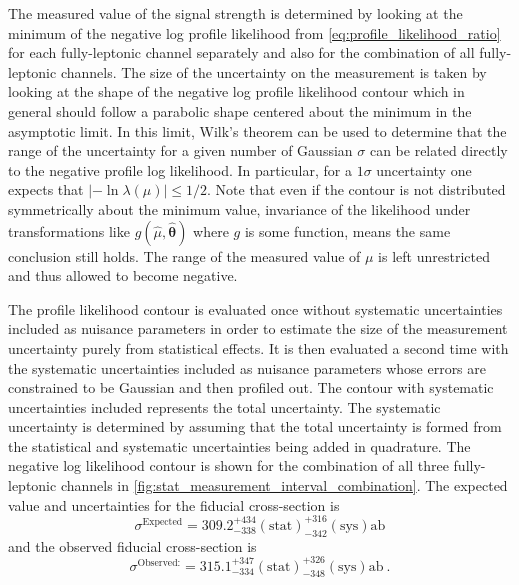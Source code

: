 The measured value of the signal strength is determined by looking 
at the minimum 
of the negative log profile likelihood from 
\eqn\eqref{eq:profile_likelihood_ratio}
for each fully-leptonic channel separately and also 
for the combination of all fully-leptonic channels. 
The size of the uncertainty on the 
measurement is taken by looking at the shape of the negative log 
profile likelihood contour which in general should follow a parabolic
shape centered about the minimum in the asymptotic limit. In this limit,
Wilk's theorem \cite{Wilk:1938}
can be used \cite{PDG:2014}
to determine that
the range of the 
uncertainty for a given number of Gaussian $\sigma$ can be related
directly 
to the negative profile log likelihood.  In particular, for 
a $1\sigma$ uncertainty one expects that 
$|-\ln \lambda(\mu)| \leq 1/2$.
Note that even if the contour is not distributed symmetrically about 
the minimum
value, invariance of the likelihood under 
transformations like $g(\hat{\mu},\hat{\boldsymbol{\theta}})$ where $g$ is some function, 
means the same conclusion still holds.
The range of the measured value of $\mu$ is left unrestricted and thus
allowed to become negative.

The profile likelihood contour is evaluated once without 
systematic uncertainties included
as nuisance parameters in order to estimate the size of the 
measurement uncertainty purely 
from statistical effects. It is then evaluated a second time with the 
systematic uncertainties included
as nuisance parameters whose errors are constrained to be Gaussian and then 
profiled out. The contour with systematic uncertainties included represents
the total uncertainty. The systematic uncertainty is determined by 
assuming that
the total uncertainty is formed from the statistical and systematic 
uncertainties being added
in quadrature.
The negative log likelihood contour is shown
for the combination of all three fully-leptonic channels in 
\fig\ref{fig:stat_measurement_interval_combination}.
The expected value and uncertainties for the fiducial cross-section is
\begin{equation}
\sigma^{\textrm{Expected}} = 309.2  ^{+434}_{-338} (\textrm{stat}) ^{+316}_{-342} (\textrm{sys}) \textrm{ab}
\end{equation}
and the observed fiducial cross-section is
\begin{equation}
\sigma^{\textrm{Observed:}} = 315.1  ^{+347}_{-334} (\textrm{stat}) ^{+326}_{-348} (\textrm{sys}) \textrm{ab} ~.
\end{equation}

